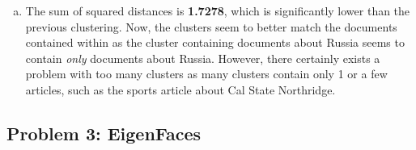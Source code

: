 \documentclass[twoside,11pt]{article}
\newcommand{\figdir}{figs}
\theoremstyle{definition}
\begin{document}
\begin{enumerate}[(a)]
\item The sum of squared distances is \textbf{1.7278}, which is significantly lower than the previous clustering.
Now, the clusters seem to better match the documents contained within as the cluster containing documents about Russia seems to contain \emph{only} documents about Russia.
However, there certainly exists a problem with too many clusters as many clusters contain only 1 or a few articles, such as the sports article about Cal State Northridge.

\end{enumerate}


\subsection*{Problem 3: EigenFaces}
\end{document}
